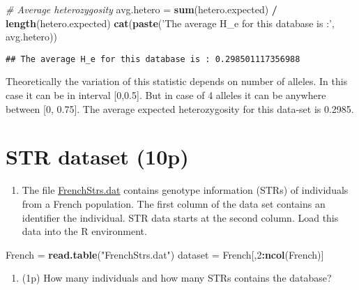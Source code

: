 \documentclass[
]{article}
\newenvironment{Shaded}{\begin{snugshade}}{\end{snugshade}}
\newcommand{\CommentTok}[1]{\textcolor[rgb]{0.56,0.35,0.01}{\textit{#1}}}
\newcommand{\DecValTok}[1]{\textcolor[rgb]{0.00,0.00,0.81}{#1}}
\newcommand{\KeywordTok}[1]{\textcolor[rgb]{0.13,0.29,0.53}{\textbf{#1}}}
\newcommand{\NormalTok}[1]{#1}
\newcommand{\OperatorTok}[1]{\textcolor[rgb]{0.81,0.36,0.00}{\textbf{#1}}}
\newcommand{\StringTok}[1]{\textcolor[rgb]{0.31,0.60,0.02}{#1}}
\providecommand{\tightlist}{%
  \setlength{\itemsep}{0pt}\setlength{\parskip}{0pt}}
\begin{document}
\begin{Shaded}
\begin{Highlighting}[]
\CommentTok{# Average heterozygosity}
\NormalTok{avg.hetero =}\StringTok{ }\KeywordTok{sum}\NormalTok{(hetero.expected) }\OperatorTok{/}\StringTok{ }\KeywordTok{length}\NormalTok{(hetero.expected)}
\KeywordTok{cat}\NormalTok{(}\KeywordTok{paste}\NormalTok{(}\StringTok{'The average H_e for this database is :'}\NormalTok{, avg.hetero))}
\end{Highlighting}
\end{Shaded}

\begin{verbatim}
## The average H_e for this database is : 0.298501117356988
\end{verbatim}

Theoretically the variation of this statistic depends on number of
alleles. In this case it can be in interval {[}0,0.5{]}. But in case of
4 alleles it can be anywhere between {[}0, 0.75{]}. The average expected
heterozygosity for this data-set is 0.2985.

\hypertarget{str-dataset-10p}{%
\section{STR dataset (10p)}\label{str-dataset-10p}}

\begin{enumerate}
\def\labelenumi{\arabic{enumi}.}
\tightlist
\item
  The file
  \href{http://www-eio.upc.es/~jan/data/bsg/FrenchStrs.dat}{FrenchStrs.dat}
  contains genotype information (STRs) of individuals from a French
  population. The first column of the data set contains an identifier
  the individual. STR data starts at the second column. Load this data
  into the R environment.
\end{enumerate}

\begin{Shaded}
\begin{Highlighting}[]
\NormalTok{French =}\StringTok{ }\KeywordTok{read.table}\NormalTok{(}\StringTok{"FrenchStrs.dat"}\NormalTok{)}
\NormalTok{dataset =}\StringTok{ }\NormalTok{French[,}\DecValTok{2}\OperatorTok{:}\KeywordTok{ncol}\NormalTok{(French)]}
\end{Highlighting}
\end{Shaded}

\begin{enumerate}
\def\labelenumi{\arabic{enumi}.}
\setcounter{enumi}{1}
\tightlist
\item
  (1p) How many individuals and how many STRs contains the database?
\end{enumerate}
\end{document}
